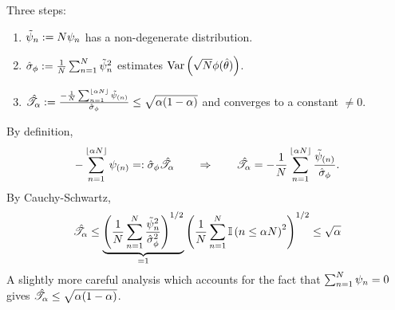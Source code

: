 \begin{frame}[t]{Three steps:}

%
\begin{enumerate}
    \item $\tilde{\psi}_n := N \psi_n$ has a non-degenerate distribution.
    \item $\hat\sigma_{\phi} := \frac{1}{N}\sum_{n=1}^N \tilde{\psi}_n^2$ estimates
        $\underset{}{\mathrm{Var}}\left(\sqrt{N}\phi(\hat{\theta})\right)$.
    \item $\hat{\mathscr{T}}_\alpha :=
        \frac{-\frac{1}{N}\sum_{n=1}^{\lfloor \alpha N \rfloor}
            \tilde{\psi}_{(n)}
        }
        {\hat\sigma_{\phi}}
        \le \sqrt{\alpha(1-\alpha)}$ and
        converges to a constant $\ne 0$.
\end{enumerate}

By definition,
%
\begin{align*}
%
-\sum_{n=1}^{\lfloor \alpha N \rfloor} \infl_{(n)}
    =: \noise \shape
\quad\quad\Rightarrow\quad\quad
\shape
= -\frac{1}{N}
    \sum_{n=1}^{\lfloor \alpha N \rfloor} \frac{\inflbar_{(n)}}{\noise}.
%
\end{align*}
%
By Cauchy-Schwartz,
%
\begin{align*}
%
\shape \le
\underbrace{
\left(
\meann \frac{\inflbar_{n}^2}{\noise^2}
\right)^{1/2}
}_{=1}
\left(\meann \ind{n \le \alpha N }^2 \right)^{1/2} \le \sqrt{\alpha}
%
\end{align*}
%
A slightly more careful analysis which accounts for
the fact that $\sum_{n=1}^N \psi_n = 0$ gives $\hat{\mathscr{T}}_\alpha \le \sqrt{\alpha(1-\alpha)}$.


\end{frame}

%
%
%
%
%





